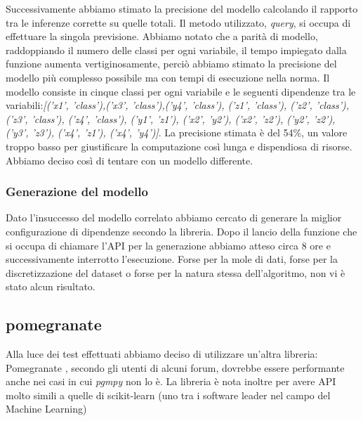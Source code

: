 \documentclass[12pt]{article}
\begin{document}
Successivamente abbiamo stimato la precisione del modello calcolando il rapporto tra le inferenze corrette su quelle totali. Il metodo utilizzato, \emph{query}, si occupa di effettuare la singola previsione. Abbiamo notato che a parità di modello, raddoppiando il numero delle classi per ogni variabile, il tempo impiegato dalla funzione aumenta vertiginosamente, perciò abbiamo stimato la precisione del modello più complesso possibile ma con tempi di esecuzione nella norma. \newline
Il modello consiste in cinque classi per ogni variabile e le seguenti dipendenze tra le variabili:\newline \emph{[('x1', 'class'),('x3', 'class'),('y4', 'class'), ('z1', 'class'), ('z2', 'class'), ('z3', 'class'), ('z4', 'class'), ('y1', 'z1'), ('x2', 'y2'), ('x2', 'z2'), ('y2', 'z2'), ('y3', 'z3'), ('x4', 'z1'),  ('x4', 'y4')]}.\newline
La precisione stimata è del 54\%, un valore troppo basso per giustificare la computazione così lunga e dispendiosa di risorse. Abbiamo deciso così di tentare con un modello differente.

\subsubsection{Generazione del modello}
Dato l'insuccesso del modello correlato abbiamo cercato di generare la miglior configurazione di dipendenze secondo la libreria. Dopo il lancio della funzione che si occupa di chiamare l'API per la generazione abbiamo atteso circa 8 ore e successivamente interrotto l'esecuzione. Forse per la mole di dati, forse per la discretizzazione del dataset o forse per la natura stessa dell'algoritmo, non vi è stato alcun risultato.

\subsection{pomegranate}
Alla luce dei test effettuati abbiamo deciso di utilizzare un'altra libreria: Pomegranate \cite{pomegranate}, secondo gli utenti di alcuni forum, dovrebbe essere performante anche nei casi in cui \emph{pgmpy} non lo è. La libreria è nota inoltre per avere API molto simili a quelle di scikit-learn \cite{scikit-learn} (uno tra i software leader nel campo del Machine Learning) 
\end{document}
